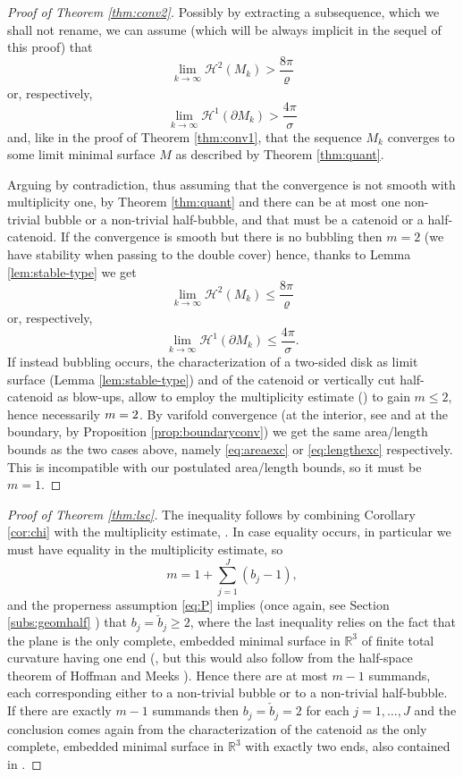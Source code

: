 \documentclass[10pt]{amsart}
\newcounter{cas}
\theoremstyle{definition}
\newcommand{\R}{\mathbb{R}}
\newcommand{\h}{\mathscr{H}}
\begin{document}
\begin{proof} [Proof of Theorem \ref{thm:conv2}]
Possibly by extracting a subsequence, which we shall not rename, we can assume (which will be always implicit in the sequel of this proof) that
\[
\lim_{k\to\infty}\h^2(M_k)> \frac{8 \pi}{\varrho}
\]
or, respectively,
\[
\lim_{k\to\infty}\h^1(\partial M_k)>\frac{4\pi}{\sigma}
\]
and, like in the proof of Theorem \ref{thm:conv1}, that the sequence $M_k$ converges to some limit minimal surface $M$ as described by Theorem \ref{thm:quant}.

Arguing by contradiction, thus assuming that the convergence is not smooth with multiplicity one, by Theorem \ref{thm:quant} and \cite[Lem.\,12]{ABCS18} there can be at most one non-trivial bubble or a non-trivial half-bubble, and that must be a catenoid or a half-catenoid. If the convergence is smooth but there is no bubbling then $m=2$ (we have stability when passing to the double cover) hence, thanks to Lemma \ref{lem:stable-type} we get
\begin{equation}\label{eq:areaexc}
\lim_{k\to\infty}\h^2(M_k)\leq \frac{8 \pi}{\varrho}
\end{equation}
or, respectively,
\begin{equation}\label{eq:lengthexc}
\lim_{k\to\infty}\h^1(\partial M_k)\leq \frac{4\pi}{\sigma}.
\end{equation}
If instead bubbling occurs, the characterization of a two-sided disk as limit surface (\cf Lemma \ref{lem:stable-type}) and of the catenoid or vertically cut half-catenoid as blow-ups, allow to employ the multiplicity estimate
(\cite[Prop.\,13]{ABCS18})
to gain $m\leq 2$, hence necessarily $m=\nobreak2$.
By varifold convergence (at the interior, see \cite{ACS17} and at the boundary, by Proposition \ref{prop:boundaryconv}) we get the same area/length bounds as the two cases above, namely \eqref{eq:areaexc} or \eqref{eq:lengthexc} respectively.
This is incompatible with our postulated area/length bounds, so it must be $m=1$.
\end{proof}

\begin{proof}[Proof of Theorem \ref{thm:lsc}]
The inequality follows by combining Corollary \ref{cor:chi} with the multiplicity estimate, \cite[Prop.\,13]{ABCS18}.
In case equality occurs, in particular we must have equality in the multiplicity estimate, so
\[
m=1+\sum_{j=1}^J(b_j-1),
\]
and the properness assumption \eqref{eq:P} implies (once again, see Section \ref{subs:geomhalf} ) that $b_j=\check{b}_j\geq 2$, where the last inequality relies on the fact that the plane is the only complete, embedded minimal surface in $\R^3$ of finite total curvature having one end (\cf \cite{Sc83}, but this would also follow from the half-space theorem of Hoffman and Meeks \cite{HM90}). Hence there are at most $m-1$ summands, each corresponding either to a non-trivial bubble or to a non-trivial half-bubble. If there are exactly $m-1$ summands then $b_j=\check{b}_j=2$ for each $j=1,\ldots, J$ and the conclusion comes again from the characterization of the catenoid as the only complete, embedded minimal surface in $\R^3$ with exactly two ends, also contained in \cite{Sc83}.
\end{proof}
\end{document}
